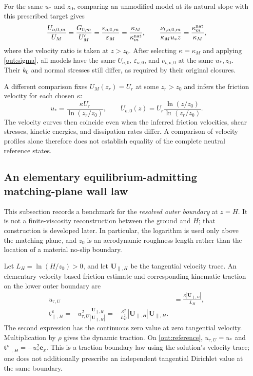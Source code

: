 \documentclass[11pt,a4paper]{article}
\numberwithin{equation}{section}
\newcommand{\eps}{\varepsilon}
\newcommand{\ust}{u_*}
\begin{document}
For the same $\ust$ and $z_0$, comparing an unmodified model at its
natural slope with this prescribed target gives
\begin{equation}
 \frac{U_{o,0,m}}{U_M}
 =\frac{G_{0,m}}{U_M'}
 =\frac{\eps_{o,0,m}}{\eps_M}
 =\frac{\kappa_M}{\kappa_m^{\rm nat}},\qquad
 \frac{\nu_{t,o,0,m}}{\kappa_M\ust z}
 =\frac{\kappa_m^{\rm nat}}{\kappa_M},
 \label{out:MOSTratios}
\end{equation}
where the velocity ratio is taken at $z>z_0$.
After selecting $\kappa=\kappa_M$ and applying
\cref{out:sigma}, all models have the same $U_{o,0}$,
$\eps_{o,0}$, and $\nu_{t,o,0}$ at the same $\ust,z_0$.
Their $k_0$ and normal stresses still differ, as required by their
original closures.

A different comparison fixes $U_M(z_r)=U_r$ at some $z_r>z_0$ and
infers the friction velocity for each chosen $\kappa$:
\begin{equation}
 \ust=\frac{\kappa U_r}{\ln(z_r/z_0)},\qquad
 U_{o,0}(z)=U_r\frac{\ln(z/z_0)}{\ln(z_r/z_0)}.
 \label{out:velocitynormalization}
\end{equation}
The velocity curves then coincide even when the inferred friction
velocities, shear stresses, kinetic energies, and dissipation rates
differ. A comparison of velocity profiles alone therefore does not
establish equality of the complete neutral reference states.

\subsection{An elementary equilibrium-admitting matching-plane wall law}
\label{out:walllaw}

This subsection records a benchmark for the \emph{resolved outer
boundary} at $z=H$. It is not a finite-viscosity reconstruction between
the ground and $H$; that construction is developed later. In particular,
the logarithm is used only above the matching plane, and $z_0$ is an
aerodynamic roughness length rather than the location of a material
no-slip boundary.

Let $L_H=\ln(H/z_0)>0$, and let
$\boldsymbol U_{\parallel,H}$ be the tangential velocity trace.
An elementary velocity-based friction estimate and corresponding
kinematic traction on the lower outer boundary are
\begin{align}
 u_{\tau,U}&=\frac{\kappa|\boldsymbol U_{\parallel,H}|}{L_H},
 \label{out:utauU}\\
 \boxed{\boldsymbol t_{\parallel,H}^{o}
   =-u_{\tau,U}^2
       \frac{\boldsymbol U_{\parallel,H}}
            {|\boldsymbol U_{\parallel,H}|}
   =-\frac{\kappa^2}{L_H^2}
       |\boldsymbol U_{\parallel,H}|\boldsymbol U_{\parallel,H}.}
 \label{out:walltraction}
\end{align}
The second expression has the continuous zero value at zero tangential
velocity. Multiplication by $\rho$ gives the dynamic traction.
On \cref{out:reference}, $u_{\tau,U}=\ust$ and
$\boldsymbol t_{\parallel,H}^{o}=-\ust^2\boldsymbol e_x$.
This is a traction boundary law using the solution's velocity trace;
one does not additionally prescribe an independent tangential
Dirichlet value at the same boundary.
\end{document}

